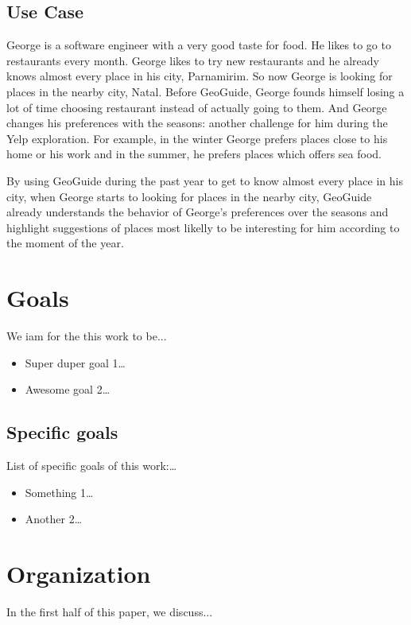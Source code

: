 \subsection{Use Case}

George is a software engineer with a very good taste for food. He likes to go to restaurants every month. George likes to try new restaurants and he already knows almost every place in his city, Parnamirim. So now George is looking for places in the nearby city, Natal. Before GeoGuide, George founds himself losing a lot of time choosing restaurant instead of actually going to them. And George changes his preferences with the seasons: another challenge for him during the Yelp exploration. For example, in the winter George prefers places close to his home or his work and in the summer, he prefers places which offers sea food.

By using GeoGuide during the past year to get to know almost every place in his city, when George starts to looking for places in the nearby city, GeoGuide already understands the behavior of George's preferences over the seasons and highlight suggestions of places most likelly to be interesting for him according to the moment of the year.

\section{Goals}

We iam for the this work to be...

\begin{itemize}
	\item Super duper goal 1\ldots
	\item Awesome goal 2\ldots
\end{itemize}

\subsection{Specific goals}

List of specific goals of this work:\ldots

\begin{itemize}
	\item Something 1\ldots
	\item Another 2\ldots
\end{itemize}

\section{Organization}

In the first half of this paper, we discuss...
